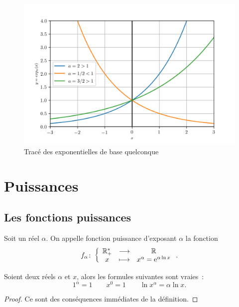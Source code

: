 \begin{figure}
    \centering
    \includegraphics[scale = 1.0]{expa.png}
    \caption{Tracé des exponentielles de base quelconque}
    \label{fig:traceexpa}
\end{figure}

\section{Puissances}
\label{sec:chap1-puissances}

\subsection{Les fonctions puissances}
\label{subsec:chap1-fonctionspuissances}

\begin{defdef}
    Soit un réel \(\alpha\). On appelle fonction puissance d'exposant 
    \(\alpha\) la fonction
    \begin{equation}
        f_{\alpha}\colon \left\{\begin{array}{ccc} \mathbb{R}_{+}^{*} & \longrightarrow &\mathbb{R}\\ x & \longmapsto & x^{\alpha} = \operatorname{e}^{\alpha \ln 
        x} \end{array} \right..
    \end{equation}
\end{defdef}

\begin{prop}
    Soient deux réels \(\alpha\) et \(x\), alors les formules suivantes sont 
    vraies~:
    \begin{equation}
        1^{\alpha} = 1 \qquad x^0 = 1 \qquad \ln x^{\alpha} = \alpha \ln x.
    \end{equation}
\end{prop}

\begin{proof}
    Ce sont des conséquences immédiates de la définition.
\end{proof}

